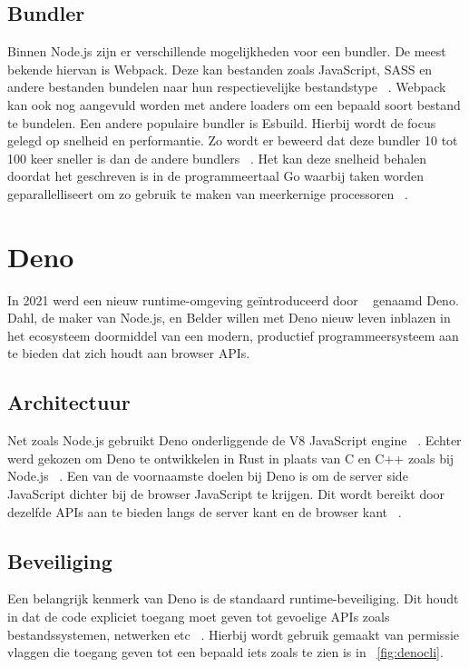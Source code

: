 \subsection{Bundler}
Binnen Node.js zijn er verschillende mogelijkheden voor een bundler. De meest bekende hiervan is Webpack. 
Deze kan bestanden zoals JavaScript, SASS en andere bestanden bundelen naar hun respectievelijke bestandstype ~\autocite{Laurila2020}. 
Webpack kan ook nog aangevuld worden met andere loaders om een bepaald soort bestand te bundelen. Een andere populaire bundler is Esbuild.
Hierbij wordt de focus gelegd op snelheid en performantie. Zo wordt er beweerd dat deze bundler 10 tot 100 keer sneller is dan de andere bundlers ~\autocite{Couriol2020}.
Het kan deze snelheid behalen doordat het geschreven is in de programmeertaal Go waarbij taken worden geparallelliseert om zo gebruik te maken van meerkernige processoren ~\autocite{Couriol2020}.

\section{Deno}
In 2021 werd een nieuw runtime-omgeving geïntroduceerd door ~\textcite{Dahl2021} genaamd Deno.
Dahl, de maker van Node.js, en Belder willen met Deno nieuw leven inblazen in het ecosysteem doormiddel van een
modern, productief programmeersysteem aan te bieden dat zich houdt aan browser APIs.

\subsection{Architectuur}
Net zoals Node.js gebruikt Deno onderliggende de V8 JavaScript engine ~\autocite{DenoLand2023}. 
Echter werd gekozen om Deno te ontwikkelen in Rust in plaats van C en C++ zoals bij Node.js ~\autocite{DenoLand2023}.
Een van de voornaamste doelen bij Deno is om de server side JavaScript dichter bij de browser JavaScript te krijgen.
Dit wordt bereikt door dezelfde APIs aan te bieden langs de server kant en de browser kant ~\autocite{Barrow2022}.

\subsection{Beveiliging}
Een belangrijk kenmerk van Deno is de standaard runtime-beveiliging.
Dit houdt in dat de code expliciet toegang moet geven tot gevoelige APIs zoals bestandssystemen, netwerken etc ~\autocite{DenoLand2023}. 
Hierbij wordt gebruik gemaakt van permissie vlaggen die toegang geven tot een bepaald iets zoals te zien is in ~\ref{fig:denocli}.

